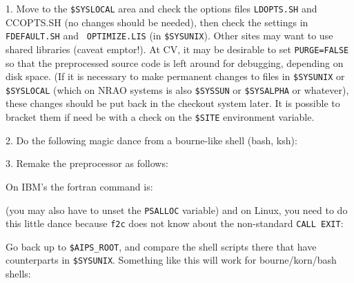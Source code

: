 \item{1.} Move to the {\tt\$SYSLOCAL} area and check the options files
          {\tt LDOPTS.SH} and {CCOPTS.SH} (no changes should be needed),
          then check the settings in {\tt FDEFAULT.SH} and {\tt
          OPTIMIZE.LIS} (in {\tt\$SYSUNIX}).  Other sites may want to
          use shared libraries (caveat emptor!).  At CV, it may be
          desirable to set {\tt PURGE=FALSE} so that the preprocessed
          source code is left around for debugging, depending on disk
          space.  (If it is necessary to make permanent changes to files
          in {\tt\$SYSUNIX} or {\tt\$SYSLOCAL} (which on NRAO systems is
          also {\tt\$SYSSUN} or {\tt \$SYSALPHA} or whatever), these
          changes should be put back in the checkout system later.  It
          is possible to bracket them if need be with a check on the
          {\tt\$SITE} environment variable.

\item{2.} Do the following magic dance from a bourne-like shell (bash,
	  ksh):
\medskip
{}
\medskip

\item{3.} Remake the preprocessor as follows:

\medskip
{}\medskip
{}\medskip

\item{} On IBM's the fortran command is:\medskip

\medskip

\item{} (you may also have to unset the {\tt PSALLOC} variable) and on
Linux, you need to do this little dance because {\tt f2c} does not know
about the non-standard {\tt CALL EXIT}:\medskip

\medskip

\noindent Go back up to {\tt\$AIPS\_ROOT}, and compare the shell scripts
there that have counterparts in {\tt\$SYS\-UNIX}.  Something like this
will work for bourne/korn/bash shells:\medskip

